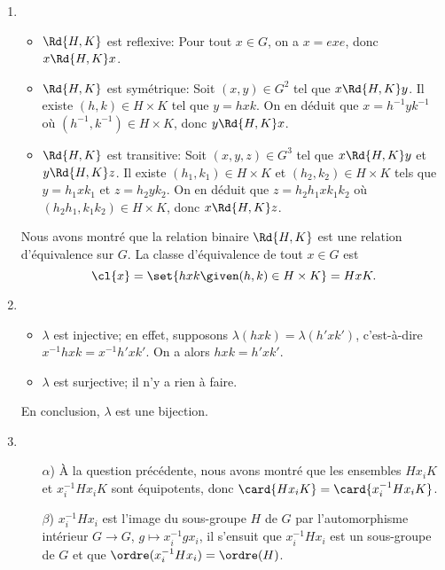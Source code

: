 \begin{enumerate}
  \item
    \begin{itemize}
      \item
        $\Rd{H,K}$ est reflexive:
        Pour tout $x\in G$, on a $x = exe$, donc $x \Rd{H,K} x$.

      \item
        $\Rd{H,K}$ est symétrique:
        Soit $(x,y)\in G^2$ tel que $x \Rd{H,K} y$. Il existe $(h,k)\in
        H\times K$ tel que $y = hxk$. On en déduit que $x = h^{-1}yk^{-1}$ où
        $(h^{-1},k^{-1})\in H\times K$, donc $y \Rd{H,K} x$.

      \item
        $\Rd{H,K}$ est transitive:
        Soit $(x,y,z)\in G^3$ tel que $x \Rd{H,K} y$ et $y \Rd{H,K} z$. Il
        existe $(h_1,k_1)\in H\times K$ et $(h_2,k_2)\in H\times K$ tels que
        $y = h_1xk_1$ et $z = h_2yk_2$. On en déduit que $z = h_2h_1xk_1k_2$ où
        $(h_2h_1,k_1k_2)\in H\times K$, donc $x \Rd{H,K} z$.
    \end{itemize}

    Nous avons montré que la relation binaire $\Rd{H,K}$ est une relation
    d'équivalence sur $G$. La classe d'équivalence de tout $x\in G$ est
    \[
      \cl{x} = \set{hxk \given (h,k)\in H\times K} = HxK.
    \]

  \item
    \begin{itemize}
      \item
        $\lambda$ est injective; en effet, supposons
        $\lambda(hxk) = \lambda(h'xk')$, c'est-à-dire
        $x^{-1}hxk = x^{-1}h'xk'$. On a alors $hxk = h'xk'$.

      \item
        $\lambda$ est surjective; il n'y a rien à faire.
    \end{itemize}

    En conclusion, $\lambda$ est une bijection.

  \item
    \begin{enumerate}
      \item[$\alpha$)]
        À la question précédente, nous avons montré que les ensembles
        $Hx_iK$ et $x_i^{-1}Hx_iK$ sont équipotents, donc
        $\card{Hx_iK} = \card{x_i^{-1}Hx_iK}$.

      \item[$\beta$)]
        $x_i^{-1}Hx_i$ est l'image du sous-groupe $H$ de $G$ par l'automorphisme
        intérieur $G\to G$, $g\mapsto x_i^{-1}gx_i$, il s'ensuit que
        $x_i^{-1}Hx_i$ est un sous-groupe de $G$ et que
        $\ordre(x_i^{-1}Hx_i)=\ordre(H)$.


\end{enumerate}
\end{enumerate}
